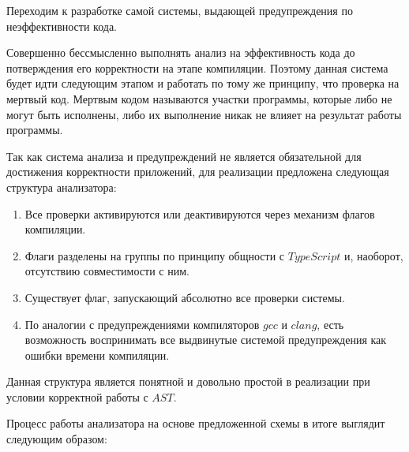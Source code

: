 \documentclass{mipt-thesis-bs}
\begin{document}
Переходим к разработке самой системы, выдающей предупреждения по неэффективности кода.

Совершенно бессмысленно выполнять 
анализ на эффективность кода до потверждения его корректности на этапе компиляции. 
Поэтому данная система будет идти следующим этапом и работать по тому же принципу, что 
проверка на мертвый код. Мертвым кодом называются участки программы, 
которые либо не могут быть исполнены, либо их выполнение никак не влияет на 
результат работы программы.

Так как система анализа и предупреждений не является обязательной для 
достижения корректности приложений, для реализации предложена 
следующая структура анализатора:
\begin{enumerate}
    \item Все проверки активируются или 
    деактивируются через механизм флагов компиляции.
    \item Флаги разделены на группы по 
    принципу общности с $TypeScript$ и, наоборот, отсутствию совместимости с ним.
    \item Существует флаг, запускающий абсолютно все проверки системы.
    \item По аналогии с предупреждениями компиляторов $gcc$ и $clang$,
    есть возможность воспринимать все выдвинутые системой предупреждения 
    как ошибки времени компиляции.
\end{enumerate}

Данная структура является понятной и довольно простой в реализации при условии 
корректной работы с $AST$.

Процесс работы анализатора на основе предложенной схемы в итоге выглядит следующим образом:
\end{document}
